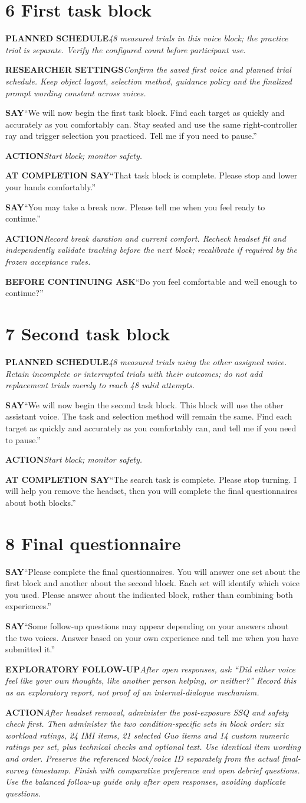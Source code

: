 \documentclass[11pt,letterpaper]{article}
\newcommand{\step}[1]{\Needspace{7\baselineskip}\section{#1}}
\newcommand{\say}[2]{\Needspace{4\baselineskip}\par\textbf{#1}\enspace #2\par}
\newcommand{\action}[2]{\Needspace{3\baselineskip}\par{\color{ActionInk}\textbf{#1}\enspace\textit{#2}}\par}
\begin{document}
\step{6 First task block}
\action{PLANNED SCHEDULE}{48 measured trials in this voice block; the practice trial is separate. Verify the configured count before participant use.}
\action{RESEARCHER SETTINGS}{Confirm the saved first voice and planned trial schedule. Keep object layout, selection method, guidance policy and the finalized prompt wording constant across voices.}
\say{SAY}{``We will now begin the first task block. Find each target as quickly and accurately as you comfortably can. Stay seated and use the same right-controller ray and trigger selection you practiced. Tell me if you need to pause.''}
\action{ACTION}{Start block; monitor safety.}
\say{AT COMPLETION SAY}{``That task block is complete. Please stop and lower your hands comfortably.''}
\say{SAY}{``You may take a break now. Please tell me when you feel ready to continue.''}
\action{ACTION}{Record break duration and current comfort. Recheck headset fit and independently validate tracking before the next block; recalibrate if required by the frozen acceptance rules.}
\say{BEFORE CONTINUING ASK}{``Do you feel comfortable and well enough to continue?''}
\step{7 Second task block}
\action{PLANNED SCHEDULE}{48 measured trials using the other assigned voice. Retain incomplete or interrupted trials with their outcomes; do not add replacement trials merely to reach 48 valid attempts.}
\say{SAY}{``We will now begin the second task block. This block will use the other assistant voice. The task and selection method will remain the same. Find each target as quickly and accurately as you comfortably can, and tell me if you need to pause.''}
\action{ACTION}{Start block; monitor safety.}
\say{AT COMPLETION SAY}{``The search task is complete. Please stop turning. I will help you remove the headset, then you will complete the final questionnaires about both blocks.''}
\clearpage
\step{8 Final questionnaire}
\say{SAY}{``Please complete the final questionnaires. You will answer one set about the first block and another about the second block. Each set will identify which voice you used. Please answer about the indicated block, rather than combining both experiences.''}
\say{SAY}{``Some follow-up questions may appear depending on your answers about the two voices. Answer based on your own experience and tell me when you have submitted it.''}
\action{EXPLORATORY FOLLOW-UP}{After open responses, ask ``Did either voice feel like your own thoughts, like another person helping, or neither?'' Record this as an exploratory report, not proof of an internal-dialogue mechanism.}
\action{ACTION}{After headset removal, administer the post-exposure SSQ and safety check first. Then administer the two condition-specific sets in block order: six workload ratings, 24 IMI items, 21 selected Guo items and 14 custom numeric ratings per set, plus technical checks and optional text. Use identical item wording and order. Preserve the referenced block/voice ID separately from the actual final-survey timestamp. Finish with comparative preference and open debrief questions. Use the balanced follow-up guide only after open responses, avoiding duplicate questions.}
\end{document}
